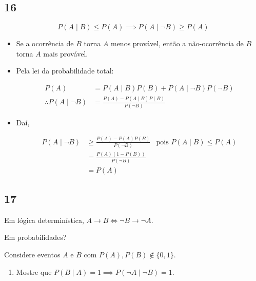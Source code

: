 \documentclass[
  11pt]{report}
\providecommand{\tightlist}{%
  \setlength{\itemsep}{0pt}\setlength{\parskip}{0pt}}
\begin{document}
\hypertarget{section-13}{%
\subsection*{16}\label{section-13}}

\begin{rmdbox}
\[
P(A \mid B) \leq P(A) \implies P(A \mid \neg B) \geq P(A)
\]

\end{rmdbox}

\begin{itemize}
\item
  Se a ocorrência de $B$ torna $A$ menos provável, então a não-ocorrência de $B$ torna $A$ mais provável.
\item
  Pela lei da probabilidade total:

  \[
  \begin{aligned}
  P(A) &= P(A \mid B)P(B) + P(A \mid \neg B)P(\neg B) \\
  \therefore P(A \mid \neg B) &= 
    \frac{P(A) - P(A \mid B)P(B)}{P(\neg B)}
  \end{aligned}
  \]
\item
  Daí,

  \[
  \begin{aligned}
  P(A \mid \neg B) 
  &\geq
    \frac{P(A) - P(A)P(B)}{P(\neg B)} & \text{pois } P(A \mid B) \leq P(A) \\
  &= \frac{P(A)(1 - P(B))}{P(\neg B)} \\
  &= P(A)
  \end{aligned}
  \]
\end{itemize}

\hypertarget{section-14}{%
\subsection*{17}\label{section-14}}

\begin{rmdbox}

Em lógica determinística, $A \to B \iff \neg B \to \neg A$.

Em probabilidades?

Considere eventos $A$ e $B$ com $P(A), P(B) \not\in \{0, 1\}$.

\begin{enumerate}
\def\labelenumi{\alph{enumi}.}
\tightlist
\item
  Mostre que $P(B \mid A) = 1 \implies P(\neg A \mid \neg B) = 1$.
\end{enumerate}

\end{rmdbox}
\end{document}
